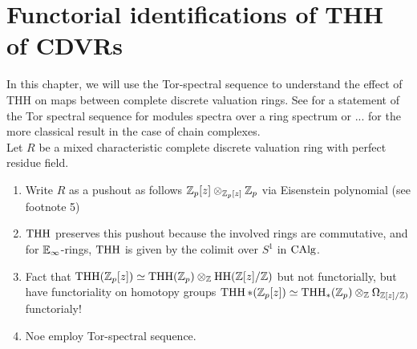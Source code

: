 \chapter{Functorial identifications of THH of CDVRs}
In this chapter, we will use the Tor-spectral sequence to understand the effect of THH on maps between complete discrete valuation rings.
See \cite[~Proposition 7.2.1.19]{lurie2017higher} for a statement of the Tor spectral sequence for modules spectra over a ring spectrum 
or ... \cite{stacks-project} for the more classical result in the case of chain complexes.
\\
Let $R$ be a mixed characteristic complete discrete valuation ring with perfect residue field.
\begin{enumerate}
    \item Write $R$ as a pushout as follows $\mathbb{Z}_p[z]\otimes_{\mathbb{Z}_p[z]}\mathbb{Z}_p$ via Eisenstein polynomial (see footnote 5)
    \item $\operatorname{THH}$ preserves this pushout because the involved rings are commutative, and for $\mathbb{E}_\infty$-rings, $\operatorname{THH}$ is given by the colimit over $S^1$ in $\operatorname{CAlg}$.
    \item Fact that $\operatorname{THH}(\mathbb{Z}_p[z])\simeq \operatorname{THH}(\mathbb{Z}_p)\otimes_{\mathbb{Z}} \operatorname{HH}(\mathbb{Z}[z]/\mathbb{Z})$ but not functorially, but have functoriality on homotopy groups
    $\operatorname{THH}*(\mathbb{Z}_p[z])\simeq \operatorname{THH}_*(\mathbb{Z}_p)\otimes_{\mathbb{Z}} \Omega_{\mathbb{Z}[z]/\mathbb{Z})}$ functorialy!
    \item Noe employ Tor-spectral sequence.
\end{enumerate}